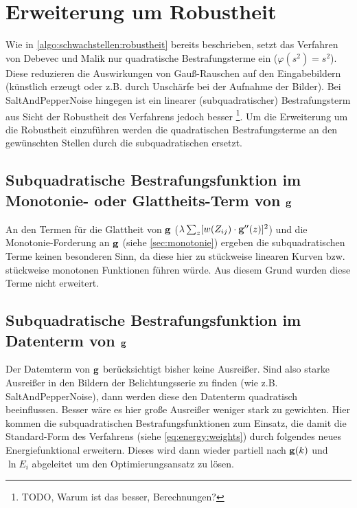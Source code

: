 \section{Erweiterung um Robustheit}
\label{sec:robustheit}

Wie in \autoref{algo:schwachstellen:robustheit} bereits beschrieben, setzt das Verfahren von Debevec und Malik nur quadratische Bestrafungsterme ein ($\varphi(s^2) = s^2$). Diese reduzieren die Auswirkungen von Gauß-Rauschen auf den Eingabebildern (künstlich erzeugt oder z.B. durch Unschärfe bei der Aufnahme der Bilder). Bei \gls{SaltAndPepperNoise} 
hingegen ist ein linearer (subquadratischer) Bestrafungsterm aus Sicht der Robustheit des Verfahrens jedoch besser \footnote{TODO, Warum ist das besser, Berechnungen?}.
Um die Erweiterung um die Robustheit einzuführen werden die quadratischen Bestrafungsterme an den gewünschten Stellen durch die subquadratischen ersetzt. 


\subsection{Subquadratische Bestrafungsfunktion im Monotonie- oder Glattheits-Term von $\mathbf g$}
An den Termen für die Glattheit von $\mathbf g$ ($\lambda  \sum_z [w(Z_{ij}) \cdot \mathbf g''(z)]^2$) und die Monotonie-Forderung an $\mathbf g$ (siehe \autoref{sec:monotonie}) ergeben die subquadratischen Terme keinen besonderen Sinn, da diese hier zu stückweise linearen Kurven bzw. stückweise monotonen Funktionen führen würde. Aus diesem Grund wurden diese Terme nicht erweitert.


\subsection{Subquadratische Bestrafungsfunktion im Datenterm von $\mathbf g$}
Der Datemterm von $\mathbf g$ berücksichtigt bisher keine Ausreißer. Sind also starke Ausreißer in den Bildern der Belichtungsserie zu finden (wie z.B. \gls{SaltAndPepperNoise}), dann werden diese den Datenterm quadratisch beeinflussen. Besser wäre es hier große Ausreißer weniger stark zu gewichten.
Hier kommen die subquadratischen Bestrafungsfunktionen zum Einsatz, die damit die Standard-Form des Verfahrens (siehe \autoref{eq:energy:weights}) durch folgendes neues Energiefunktional erweitern. Dieses wird dann wieder partiell nach $\mathbf g(k)$ und $\ln E_i$ abgeleitet um den Optimierungsansatz zu lösen. 

